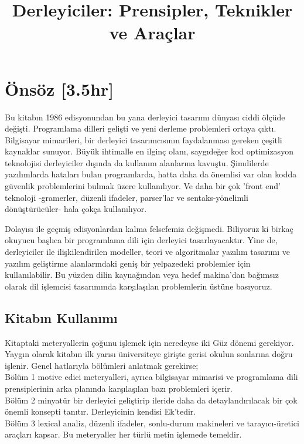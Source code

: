 \documentclass{book}
\title{Derleyiciler: Prensipler, Teknikler ve Araçlar}
\begin{document}
\chapter*{Önsöz [3.5hr]}
Bu kitabın 1986 edisyonundan bu yana derleyici tasarımı dünyası ciddi ölçüde değişti. Programlama dilleri gelişti ve yeni derleme problemleri ortaya çıktı. Bilgisayar mimarileri, bir derleyici tasarımcısının faydalanması gereken çeşitli kaynaklar sunuyor. Büyük ihtimalle en ilginç olanı, saygıdeğer kod optimizasyon teknolojisi derleyiciler dışında da kullanım alanlarına kavuştu. Şimdilerde yazılımlarda hataları bulan programlarda, hatta daha da önemlisi var olan kodda güvenlik problemlerini bulmak üzere kullanılıyor. Ve daha bir çok 'front end' teknoloji -gramerler, düzenli ifadeler, parser'lar ve sentaks-yönelimli dönüştürücüler- hala çokça kullanılıyor.

Dolayısı ile geçmiş edisyonlardan kalma felsefemiz değişmedi. Biliyoruz ki birkaç okuyucu başlıca bir programlama dili için derleyici tasarlayacaktır. Yine de, derleyiciler ile ilişkilendirilen modeller, teori ve algoritmalar yazılım tasarımı ve yazılım geliştirme alanlarındaki geniş bir yelpazedeki problemler için kullanılabilir. Bu yüzden dilin kaynağından veya hedef makina'dan bağımsız olarak dil işlemcisi tasarımında karşılaşılan problemlerin üstüne basıyoruz.

\section*{Kitabın Kullanımı}

Kitaptaki meteryallerin çoğunu işlemek için neredeyse iki Güz dönemi gerekiyor. Yaygın olarak kitabın ilk yarısı üniversiteye girişte gerisi okulun sonlarına doğru işlenir. Genel hatlarıyla bölümleri anlatmak gerekirse;
\\

Bölüm 1 motive edici meteryalleri, ayrıca bilgisayar mimarisi ve programlama dili prensiplerinin arka planında karşılaşılan bazı problemleri içerir.
\\

Bölüm 2 minyatür bir derleyici geliştirip ileride daha da detaylandırılacak bir çok önemli konsepti tanıtır. Derleyicinin kendisi Ek'tedir.
\\

Bölüm 3 lexical analiz, düzenli ifadeler, sonlu-durum makineleri ve tarayıcı-üretici araçları kapsar. Bu meteryaller her türlü metin işlemede temeldir.
\\
\end{document}
